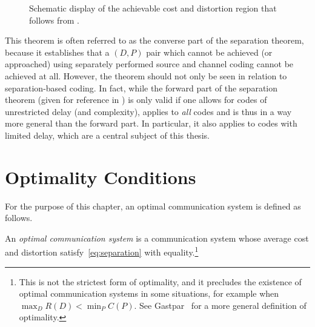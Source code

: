 \begin{figure}
  \begin{center}
  \end{center}
  \caption{Schematic display of the achievable cost and distortion region that
  follows from .}
  \label{fig:achievableregion}
\end{figure}

This theorem is often referred to as the converse part of the separation
theorem, because it establishes that a $(D,P)$ pair which cannot be achieved (or
approached) using separately performed source and channel coding cannot be
achieved at all. However, the theorem should not only be seen in relation to
separation-based coding.  In fact, while the forward part of the
separation theorem (given for reference in ) is only
valid if one allows for codes of unrestricted delay (and complexity),
 applies to \emph{all} codes and is thus in a way
more general than the forward part. In particular, it also applies to codes with
limited delay, which are a central subject of this thesis.


\section{Optimality Conditions}\label{sec:optimality}

For the purpose of this chapter, an optimal communication system is
defined as follows.

\begin{definition}
  \label{def:optimality}
  An \emph{optimal communication system} is a communication system whose
  average cost and distortion satisfy~\eqref{eq:separation} with
  equality.\footnote{This is not the strictest form of
  optimality, and it precludes the existence of optimal communication systems in
  some situations, for example when $\max_D R(D) < \min_P C(P)$. See
  Gastpar~\cite{GastparThesis} for a more general  definition of optimality.}
\end{definition}

